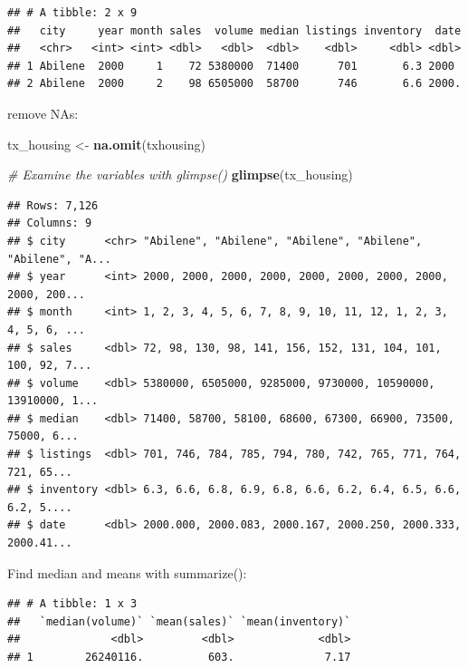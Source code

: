 \documentclass[]{book}
\newenvironment{Shaded}{\begin{snugshade}}{\end{snugshade}}
\newcommand{\CommentTok}[1]{\textcolor[rgb]{0.56,0.35,0.01}{\textit{#1}}}
\newcommand{\KeywordTok}[1]{\textcolor[rgb]{0.13,0.29,0.53}{\textbf{#1}}}
\newcommand{\NormalTok}[1]{#1}
\newcommand{\OperatorTok}[1]{\textcolor[rgb]{0.81,0.36,0.00}{\textbf{#1}}}
\newcommand{\StringTok}[1]{\textcolor[rgb]{0.31,0.60,0.02}{#1}}
\begin{document}
\begin{verbatim}
## # A tibble: 2 x 9
##   city     year month sales  volume median listings inventory  date
##   <chr>   <int> <int> <dbl>   <dbl>  <dbl>    <dbl>     <dbl> <dbl>
## 1 Abilene  2000     1    72 5380000  71400      701       6.3 2000 
## 2 Abilene  2000     2    98 6505000  58700      746       6.6 2000.
\end{verbatim}

remove NAs:

\begin{Shaded}
\begin{Highlighting}[]
\NormalTok{tx_housing <-}\StringTok{ }\KeywordTok{na.omit}\NormalTok{(txhousing)}

\CommentTok{# Examine the variables with glimpse()}
\KeywordTok{glimpse}\NormalTok{(tx_housing)}
\end{Highlighting}
\end{Shaded}

\begin{verbatim}
## Rows: 7,126
## Columns: 9
## $ city      <chr> "Abilene", "Abilene", "Abilene", "Abilene", "Abilene", "A...
## $ year      <int> 2000, 2000, 2000, 2000, 2000, 2000, 2000, 2000, 2000, 200...
## $ month     <int> 1, 2, 3, 4, 5, 6, 7, 8, 9, 10, 11, 12, 1, 2, 3, 4, 5, 6, ...
## $ sales     <dbl> 72, 98, 130, 98, 141, 156, 152, 131, 104, 101, 100, 92, 7...
## $ volume    <dbl> 5380000, 6505000, 9285000, 9730000, 10590000, 13910000, 1...
## $ median    <dbl> 71400, 58700, 58100, 68600, 67300, 66900, 73500, 75000, 6...
## $ listings  <dbl> 701, 746, 784, 785, 794, 780, 742, 765, 771, 764, 721, 65...
## $ inventory <dbl> 6.3, 6.6, 6.8, 6.9, 6.8, 6.6, 6.2, 6.4, 6.5, 6.6, 6.2, 5....
## $ date      <dbl> 2000.000, 2000.083, 2000.167, 2000.250, 2000.333, 2000.41...
\end{verbatim}

Find median and means with summarize():

\begin{Shaded}
\end{Shaded}

\begin{verbatim}
## # A tibble: 1 x 3
##   `median(volume)` `mean(sales)` `mean(inventory)`
##              <dbl>         <dbl>             <dbl>
## 1        26240116.          603.              7.17
\end{verbatim}
\end{document}
